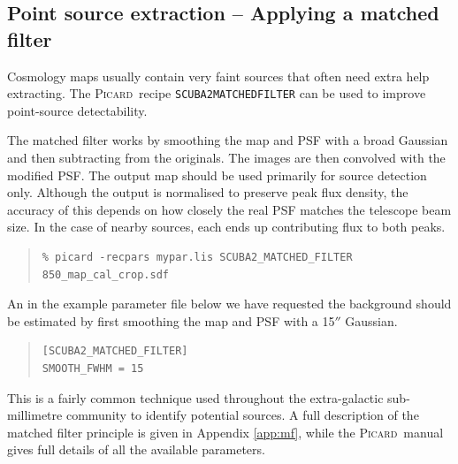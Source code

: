 \documentclass[twoside,11pt]{article}
\newcounter{box}
\newcommand{\xref}[3]{#1}
\newcommand{\xlabel}[1]{}
\renewcommand{\_}{\texttt{\symbol{95}}}
\newenvironment{myquote}{\begin{quote}\begin{small}}{\end{small}\end{quote}}
\newcommand{\gaia}{\xref{\textsc{Gaia}}{sun214}{}}
\newcommand{\picard}{\xref{\textsc{Picard}}{sun231}{}}
\begin{document}


\subsection{\xlabel{match_filter}Point source extraction --  Applying a matched filter}
\label{sec:mf}
Cosmology maps usually contain very faint sources that often need extra help extracting. The \picard\ recipe \texttt{SCUBA2\_MATCHED\_FILTER} can be used to improve point-source detectability.

The matched filter works by smoothing the map and PSF with a broad Gaussian and then subtracting from the originals. The images are then convolved with the modified PSF.  The output map should be used primarily for source detection only. Although the output is normalised to preserve peak flux density, the accuracy of this depends on how closely the real PSF matches the telescope beam size. In the case of nearby sources, each ends up contributing flux to both peaks.

 \begin{myquote}
\begin{verbatim}
% picard -recpars mypar.lis SCUBA2_MATCHED_FILTER 850_map_cal_crop.sdf
\end{verbatim}
\end{myquote}

An in the example parameter file below we have requested the background should be estimated by first smoothing the map and PSF with a 15$''$ Gaussian. 
\begin{myquote}
\begin{verbatim}
[SCUBA2_MATCHED_FILTER]
SMOOTH_FWHM = 15
\end{verbatim}
\end{myquote}
 This is a fairly common technique used throughout the extra-galactic sub-millimetre community to identify potential sources. A full description of the matched filter principle is given in Appendix \ref{app:mf}, while the \picard\ manual gives full details of all the available parameters.
\end{document}
